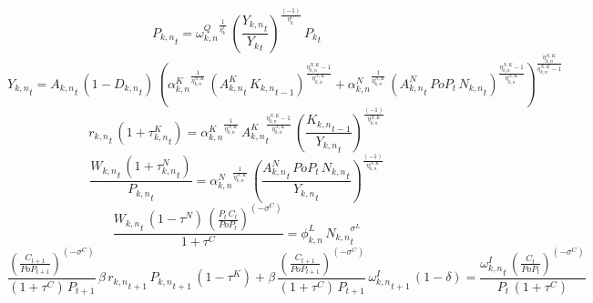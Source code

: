 \begin{dmath}
{{P_{k,n}}}_{t}={{\omega^{Q}_{k,n}}}^{\frac{1}{{{\eta^{C}_{k}}}}}\, \left(\frac{{{Y_{k,n}}}_{t}}{{{Y_k}}_{t}}\right)^{\frac{\left(-1\right)}{{{\eta^{C}_{k}}}}}\, {{P_k}}_{t}
\end{dmath}
\noindent[name= `sector specific output']
\begin{dmath}
{{Y_{k,n}}}_{t}={{A_{k,n}}}_{t}\, \left(1-{{D_{k,n}}}_{t}\right)\, \left({{\alpha^{K}_{k,n}}}^{\frac{1}{{{\eta^{N,K}_{k,n}}}}}\, \left({{A^{K}_{k,n}}}_{t}\, {{K_{k,n}}}_{t-1}\right)^{\frac{{{\eta^{N,K}_{k,n}}}-1}{{{\eta^{N,K}_{k,n}}}}}+{{\alpha^{N}_{k,n}}}^{\frac{1}{{{\eta^{N,K}_{k,n}}}}}\, \left({{A^{N}_{k,n}}}_{t}\, {PoP}_{t}\, {{N_{k,n}}}_{t}\right)^{\frac{{{\eta^{N,K}_{k,n}}}-1}{{{\eta^{N,K}_{k,n}}}}}\right)^{\frac{{{\eta^{N,K}_{k,n}}}}{{{\eta^{N,K}_{k,n}}}-1}}
\end{dmath}
\noindent[mcp= `K\_1\_1 > 0', name= `Firms FOC capital']
\begin{dmath}
{{r_{k,n}}}_{t}\, \left(1+{{\tau^{K}_{k,n}}}_{t}\right)={{\alpha^{K}_{k,n}}}^{\frac{1}{{{\eta^{N,K}_{k,n}}}}}\, {{A^{K}_{k,n}}}_{t}^{\frac{{{\eta^{N,K}_{k,n}}}-1}{{{\eta^{N,K}_{k,n}}}}}\, \left(\frac{{{K_{k,n}}}_{t-1}}{{{Y_{k,n}}}_{t}}\right)^{\frac{\left(-1\right)}{{{\eta^{N,K}_{k,n}}}}}
\end{dmath}
\noindent[mcp= `N\_1\_1 > 0', name= `Firms FOC labour']
\begin{dmath}
\frac{{{W_{k,n}}}_{t}\, \left(1+{{\tau^{N}_{k,n}}}_{t}\right)}{{{P_{k,n}}}_{t}}={{\alpha^{N}_{k,n}}}^{\frac{1}{{{\eta^{N,K}_{k,n}}}}}\, \left(\frac{{{A^{N}_{k,n}}}_{t}\, {PoP}_{t}\, {{N_{k,n}}}_{t}}{{{Y_{k,n}}}_{t}}\right)^{\frac{\left(-1\right)}{{{\eta^{N,K}_{k,n}}}}}
\end{dmath}
\noindent[mcp= `N\_1\_1>0', name= `HH FOC labour']
\begin{dmath}
\frac{{{W_{k,n}}}_{t}\, \left(1-{{\tau^{N}}}\right)\, \left(\frac{{P}_{t}\, {C}_{t}}{{PoP}_{t}}\right)^{\left(-{{\sigma^{C}}}\right)}}{1+{{\tau^{C}}}}={{\phi^{L}_{k,n}}}\, {{N_{k,n}}}_{t}^{{{\sigma^{L}}}}
\end{dmath}
\noindent[mcp= `K\_1\_1>0', name= `HH FOC capital']
\begin{dmath}
\frac{\left(\frac{{C}_{t+1}}{{PoP}_{t+1}}\right)^{\left(-{{\sigma^{C}}}\right)}}{\left(1+{{\tau^{C}}}\right)\, {P}_{t+1}}\, {{\beta}}\, {{r_{k,n}}}_{t+1}\, {{P_{k,n}}}_{t+1}\, \left(1-{{\tau^{K}}}\right)+{{\beta}}\, \frac{\left(\frac{{C}_{t+1}}{{PoP}_{t+1}}\right)^{\left(-{{\sigma^{C}}}\right)}}{\left(1+{{\tau^{C}}}\right)\, {P}_{t+1}}\, {{\omega^I_{k,n}}}_{t+1}\, \left(1-{{\delta}}\right)=\frac{{{\omega^I_{k,n}}}_{t}\, \left(\frac{{C}_{t}}{{PoP}_{t}}\right)^{\left(-{{\sigma^{C}}}\right)}}{{P}_{t}\, \left(1+{{\tau^{C}}}\right)}
\end{dmath}

